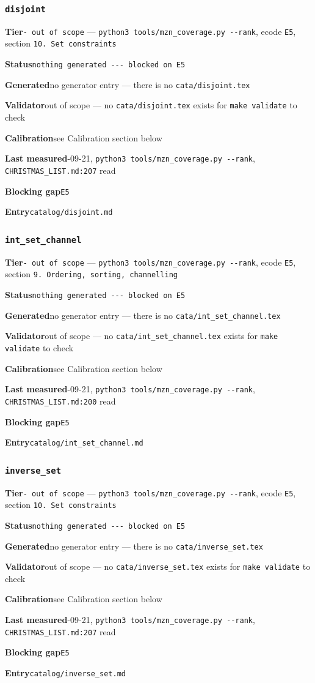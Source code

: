 \documentclass[10pt,a4paper]{article}
\newcommand{\entryfield}[2]{{\raggedright\textbf{#1}\quad #2\par}}
\begin{document}
\subsubsection*{\texttt{disjoint}}
\label{entry:disjoint}
\entryfield{Tier}{\texttt{- out of scope} --- \texttt{python3 tools/\allowbreak{}mzn\_\allowbreak{}coverage.\allowbreak{}py -\allowbreak{}-\allowbreak{}rank}, ecode \texttt{E5}, section \texttt{10. Set constraints}}
\entryfield{Status}{\texttt{nothing generated -\allowbreak{}-\allowbreak{}-\allowbreak{} blocked on E5}}
\entryfield{Generated}{no generator entry --- there is no \texttt{cata/disjoint.tex}}
\entryfield{Validator}{out of scope --- no \texttt{cata/disjoint.tex} exists for \texttt{make validate} to check}
\entryfield{Calibration}{see Calibration section below}
\entryfield{Last measured}{2026-09-21, \texttt{python3 tools/\allowbreak{}mzn\_\allowbreak{}coverage.\allowbreak{}py -\allowbreak{}-\allowbreak{}rank}, \texttt{CHRISTMAS\_LIST.md:207} read}
\entryfield{Blocking gap}{\texttt{E5}}
\entryfield{Entry}{\texttt{catalog/disjoint.md}}
\subsubsection*{\texttt{int\_\allowbreak{}set\_\allowbreak{}channel}}
\label{entry:int-set-channel}
\entryfield{Tier}{\texttt{- out of scope} --- \texttt{python3 tools/\allowbreak{}mzn\_\allowbreak{}coverage.\allowbreak{}py -\allowbreak{}-\allowbreak{}rank}, ecode \texttt{E5}, section \texttt{9.\allowbreak{} Ordering, sorting, channelling}}
\entryfield{Status}{\texttt{nothing generated -\allowbreak{}-\allowbreak{}-\allowbreak{} blocked on E5}}
\entryfield{Generated}{no generator entry --- there is no \texttt{cata/int\_set\_channel.tex}}
\entryfield{Validator}{out of scope --- no \texttt{cata/int\_set\_channel.tex} exists for \texttt{make validate} to check}
\entryfield{Calibration}{see Calibration section below}
\entryfield{Last measured}{2026-09-21, \texttt{python3 tools/\allowbreak{}mzn\_\allowbreak{}coverage.\allowbreak{}py -\allowbreak{}-\allowbreak{}rank}, \texttt{CHRISTMAS\_LIST.md:200} read}
\entryfield{Blocking gap}{\texttt{E5}}
\entryfield{Entry}{\texttt{catalog/int\_set\_channel.md}}
\subsubsection*{\texttt{inverse\_\allowbreak{}set}}
\label{entry:inverse-set}
\entryfield{Tier}{\texttt{- out of scope} --- \texttt{python3 tools/\allowbreak{}mzn\_\allowbreak{}coverage.\allowbreak{}py -\allowbreak{}-\allowbreak{}rank}, ecode \texttt{E5}, section \texttt{10. Set constraints}}
\entryfield{Status}{\texttt{nothing generated -\allowbreak{}-\allowbreak{}-\allowbreak{} blocked on E5}}
\entryfield{Generated}{no generator entry --- there is no \texttt{cata/inverse\_set.tex}}
\entryfield{Validator}{out of scope --- no \texttt{cata/inverse\_set.tex} exists for \texttt{make validate} to check}
\entryfield{Calibration}{see Calibration section below}
\entryfield{Last measured}{2026-09-21, \texttt{python3 tools/\allowbreak{}mzn\_\allowbreak{}coverage.\allowbreak{}py -\allowbreak{}-\allowbreak{}rank}, \texttt{CHRISTMAS\_LIST.md:207} read}
\entryfield{Blocking gap}{\texttt{E5}}
\entryfield{Entry}{\texttt{catalog/inverse\_set.md}}
\end{document}
